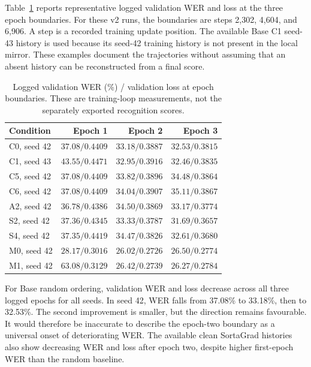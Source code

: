 \documentclass[12pt,a4paper]{report}
\begin{document}
Table~\ref{tab:results-curves} reports representative logged validation WER and loss at the three epoch boundaries. For these v2 runs, the boundaries are steps 2,302, 4,604, and 6,906. A step is a recorded training update position. The available Base C1 seed-43 history is used because its seed-42 training history is not present in the local mirror. These examples document the trajectories without assuming that an absent history can be reconstructed from a final score.

\begin{table}[htbp]\centering\small
\caption{Logged validation WER (\%) / validation loss at epoch boundaries. These are training-loop measurements, not the separately exported recognition scores.}\label{tab:results-curves}
\setlength{\tabcolsep}{4pt}
\begin{tabular}{lrrr}\toprule
Condition & Epoch 1 & Epoch 2 & Epoch 3\\\midrule
C0, seed 42 & $37.08/0.4409$ & $33.18/0.3887$ & $32.53/0.3815$ \\
C1, seed 43 & $43.55/0.4471$ & $32.95/0.3916$ & $32.46/0.3835$ \\
C5, seed 42 & $37.08/0.4409$ & $33.82/0.3896$ & $34.48/0.3864$ \\
C6, seed 42 & $37.08/0.4409$ & $34.04/0.3907$ & $35.11/0.3867$ \\
A2, seed 42 & $36.78/0.4386$ & $34.50/0.3869$ & $33.17/0.3774$ \\
S2, seed 42 & $37.36/0.4345$ & $33.33/0.3787$ & $31.69/0.3657$ \\
S4, seed 42 & $37.35/0.4419$ & $34.47/0.3826$ & $32.61/0.3680$ \\
M0, seed 42 & $28.17/0.3016$ & $26.02/0.2726$ & $26.50/0.2774$ \\
M1, seed 42 & $63.08/0.3129$ & $26.42/0.2739$ & $26.27/0.2784$ \\
\bottomrule\end{tabular}\end{table}

For Base random ordering, validation WER and loss decrease across all three logged epochs for all seeds. In seed 42, WER falls from 37.08\% to 33.18\%, then to 32.53\%. The second improvement is smaller, but the direction remains favourable. It would therefore be inaccurate to describe the epoch-two boundary as a universal onset of deteriorating WER. The available clean SortaGrad histories also show decreasing WER and loss after epoch two, despite higher first-epoch WER than the random baseline.
\end{document}
